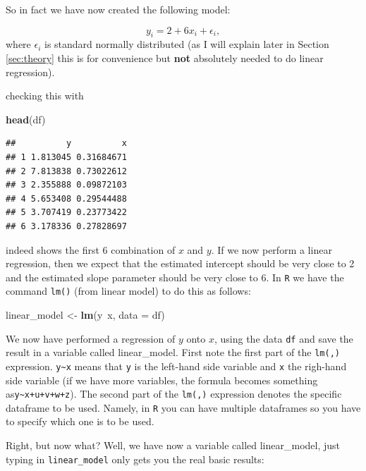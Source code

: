 \documentclass[]{article}
\newenvironment{Shaded}{\begin{snugshade}}{\end{snugshade}}
\newcommand{\KeywordTok}[1]{\textcolor[rgb]{0.13,0.29,0.53}{\textbf{{#1}}}}
\newcommand{\DataTypeTok}[1]{\textcolor[rgb]{0.13,0.29,0.53}{{#1}}}
\newcommand{\StringTok}[1]{\textcolor[rgb]{0.31,0.60,0.02}{{#1}}}
\newcommand{\NormalTok}[1]{{#1}}
\begin{document}
So in fact we have now created the following model:

\[
y_i = 2 + 6 x_i + \epsilon_i,
\] where \(\epsilon_i\) is standard normally distributed (as I will
explain later in Section \ref{sec:theory} this is for convenience but
\textbf{not} absolutely needed to do linear regression).

checking this with

\begin{Shaded}
\begin{Highlighting}[]
\KeywordTok{head}\NormalTok{(df)}
\end{Highlighting}
\end{Shaded}

\begin{verbatim}
##          y          x
## 1 1.813045 0.31684671
## 2 7.813838 0.73022612
## 3 2.355888 0.09872103
## 4 5.653408 0.29544488
## 5 3.707419 0.23773422
## 6 3.178336 0.27828697
\end{verbatim}

indeed shows the first 6 combination of \(x\) and \(y\). If we now
perform a linear regression, then we expect that the estimated intercept
should be very close to 2 and the estimated slope parameter should be
very close to 6. In \texttt{R} we have the command \texttt{lm()} (from
linear model) to do this as follows:

\begin{Shaded}
\begin{Highlighting}[]
\NormalTok{linear_model <-}\StringTok{ }\KeywordTok{lm}\NormalTok{(y~x, }\DataTypeTok{data =} \NormalTok{df)}
\end{Highlighting}
\end{Shaded}

We now have performed a regression of \(y\) onto \(x\), using the data
\texttt{df} and save the result in a variable called linear\_model.
First note the first part of the \texttt{lm(,)} expression.
\texttt{y\textasciitilde{}x} means that \texttt{y} is the left-hand side
variable and \texttt{x} the righ-hand side variable (if we have more
variables, the formula becomes something
as\texttt{y\textasciitilde{}x+u+v+w+z}). The second part of the
\texttt{lm(,)} expression denotes the specific dataframe to be used.
Namely, in \texttt{R} you can have multiple dataframes so you have to
specify which one is to be used.

Right, but now what? Well, we have now a variable called linear\_model,
just typing in \texttt{linear\_model} only gets you the real basic
results:
\end{document}
